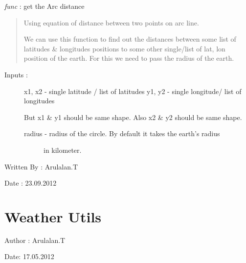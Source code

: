 \documentclass[letterpaper,10pt,english]{sphinxmanual}
\begin{document}

\begin{fulllineitems}
\label{others:nonrect_utils.getArcDistance}
\emph{func} : get the Arc distance
\begin{quote}

Using equation of distance between two points on arc line.

We can use this function to find out the distances between
some list of latitudes \& longitudes positions to some other
single/list of lat, lon position of the earth. For this we need
to pass the radius of the earth.
\end{quote}
\begin{description}
\item[{Inputs :}] \leavevmode
x1, x2 - single latitude / list of latitudes
y1, y2 - single longitude/ list of longitudes

But x1 \& y1 should be same shape. Also x2 \& y2 should be same shape.
\begin{description}
\item[{radius - radius of the circle. By default it takes the earth's radius}] \leavevmode
in kilometer.

\end{description}

\end{description}

Written By : Arulalan.T

Date : 23.09.2012

\end{fulllineitems}



\section{Weather Utils}
\label{others:weather-utils}\label{others:module-weatherutils}
Author : Arulalan.T

Date: 17.05.2012
\end{document}
